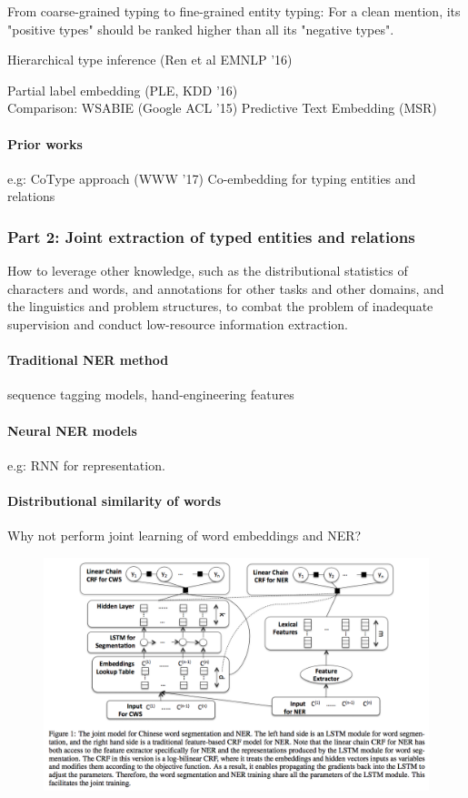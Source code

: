 From coarse-grained typing to fine-grained entity typing:
For a clean mention, its "positive types" should be ranked higher than all its "negative types". 

Hierarchical type inference (Ren et al EMNLP '16)

Partial label embedding (PLE, KDD '16)\\

Comparison: WSABIE (Google ACL '15)
Predictive Text Embedding (MSR)

\paragraph{Prior works}
e.g: CoType approach (WWW '17)
Co-embedding for typing entities and relations

\subsubsection{Part 2: Joint extraction of typed entities and relations}
How to leverage other knowledge, such as the distributional statistics of characters and words, and annotations for other tasks and other domains, and the linguistics and problem structures, to combat the problem of inadequate supervision and conduct low-resource information extraction.

\paragraph{Traditional NER method} sequence tagging models, hand-engineering features

\paragraph{Neural NER models} e.g: RNN for representation. 

\paragraph{Distributional similarity of words}
Why not perform joint learning of word embeddings and NER?
\begin{figure}[h]
	\centering
	\includegraphics[scale=0.8]{fig0601/peng2015NER}
\end{figure}

